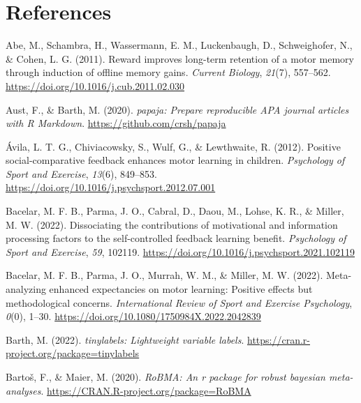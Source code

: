 \documentclass[
  man, donotrepeattitle,mask,floatsintext]{apa7}
\newlength{\cslhangindent}
\newlength{\cslentryspacingunit} %
\newenvironment{CSLReferences}[2] %
 {%
  \setlength{\parindent}{0pt}
  \ifodd #1
  \let\oldpar\par
  \def\par{\hangindent=\cslhangindent\oldpar}
  \fi
  \setlength{\parskip}{#2\cslentryspacingunit}
 }%
 {}
\begin{document}
\newpage

\hypertarget{references}{%
\section{References}\label{references}}

\vspace{2ex}

\hypertarget{refs}{}
\begin{CSLReferences}{1}{0}
\leavevmode{}%
Abe, M., Schambra, H., Wassermann, E. M., Luckenbaugh, D., Schweighofer, N., \& Cohen, L. G. (2011). Reward improves long-term retention of a motor memory through induction of offline memory gains. \emph{Current Biology}, \emph{21}(7), 557--562. \url{https://doi.org/10.1016/j.cub.2011.02.030}

\leavevmode{}%
Aust, F., \& Barth, M. (2020). \emph{{papaja}: {Prepare} reproducible {APA} journal articles with {R Markdown}}. \url{https://github.com/crsh/papaja}

\leavevmode{}%
Ávila, L. T. G., Chiviacowsky, S., Wulf, G., \& Lewthwaite, R. (2012). Positive social-comparative feedback enhances motor learning in children. \emph{Psychology of Sport and Exercise}, \emph{13}(6), 849--853. \url{https://doi.org/10.1016/j.psychsport.2012.07.001}

\leavevmode{}%
Bacelar, M. F. B., Parma, J. O., Cabral, D., Daou, M., Lohse, K. R., \& Miller, M. W. (2022). Dissociating the contributions of motivational and information processing factors to the self-controlled feedback learning benefit. \emph{Psychology of Sport and Exercise}, \emph{59}, 102119. \url{https://doi.org/10.1016/j.psychsport.2021.102119}

\leavevmode{}%
Bacelar, M. F. B., Parma, J. O., Murrah, W. M., \& Miller, M. W. (2022). Meta-analyzing enhanced expectancies on motor learning: Positive effects but methodological concerns. \emph{International Review of Sport and Exercise Psychology}, \emph{0}(0), 1--30. \url{https://doi.org/10.1080/1750984X.2022.2042839}

\leavevmode{}%
Barth, M. (2022). \emph{{tinylabels}: Lightweight variable labels}. \url{https://cran.r-project.org/package=tinylabels}

\leavevmode{}%
Bartoš, F., \& Maier, M. (2020). \emph{RoBMA: An r package for robust bayesian meta-analyses}. \url{https://CRAN.R-project.org/package=RoBMA}


\end{CSLReferences}
\end{document}
